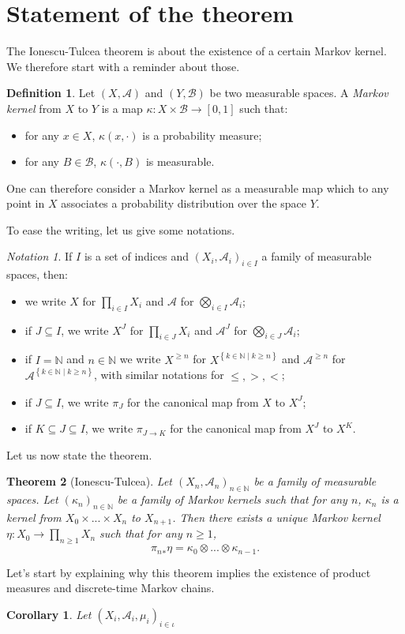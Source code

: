 \documentclass{article}
\newcommand{\A}{\mathcal{A}}
\newcommand{\B}{\mathcal{B}}
\newcommand{\N}{\mathbb{N}}
\newcommand{\set}[1]{\left\{#1\right\}}
\newcommand{\Xge}[1]{X^{\ge#1}}
\newcommand{\Age}[1]{\mathcal{A}^{\ge#1}}
\newtheorem{thm}{Theorem}[section]
\newtheorem{cor}{Corollary}[thm]
\theoremstyle{definition}
\newtheorem{defi}[thm]{Definition}
\theoremstyle{remark}
\newtheorem*{nota}{Notation}
\begin{document}
	\section{Statement of the theorem}
	The Ionescu-Tulcea theorem is about the existence of a certain Markov kernel. We therefore start with a reminder about those.

	\begin{defi}\label{def:markov-kernel}
		Let $(X,\A)$ and $(Y,\B)$ be two measurable spaces. A \emph{Markov kernel} from $X$ to $Y$ is a map $\kappa : X \times \B \to [0,1]$ such that:
		\begin{itemize}
			\item for any $x \in X$, $\kappa(x,\cdot)$ is a probability measure;
			\item for any $B \in \B$, $\kappa(\cdot,B)$ is measurable.
		\end{itemize}
		One can therefore consider a Markov kernel as a measurable map which to any point in $X$ associates a probability distribution over the space $Y$.
	\end{defi}

	To ease the writing, let us give some notations.

	\begin{nota}
		If $I$ is a set of indices and $(X_i, \A_i)_{i \in I}$ a family of measurable spaces, then:
		\begin{itemize}
			\item we write $X$ for $\prod_{i \in I} X_i$ and $\A$ for $\bigotimes_{i \in I} \A_i$;
			\item if $J \subseteq I$, we write $X^J$ for $\prod_{i \in J} X_i$ and $\A^J$ for $\bigotimes_{i \in J} \A_i$;
			\item if $I = \N$ and $n \in \N$ we write $\Xge{n}$ for $X^{\set{k \in \N \mid k \ge n}}$ and $\Age{n}$ for $\A^{\set{k \in \N \mid k \ge n}}$, with similar notations for $\le, >, <$;
			\item if $J \subseteq I$, we write $\pi_J$ for the canonical map from $X$ to $X^J$;
			\item if $ K \subseteq J \subseteq I$, we write $\pi_{J\to K}$ for the canonical map from $X^J$ to $X^K$.
		\end{itemize}
	\end{nota}

	Let us now state the theorem.

	\begin{thm}[Ionescu-Tulcea]\label{thm:it}
		Let $(X_n,\A_n)_{n\in\N}$ be a family of measurable spaces. Let $(\kappa_n)_{n\in\N}$ be a family of Markov kernels such that for any $n$, $\kappa_n$ is a kernel from $X_0 \times ... \times X_n$ to $X_{n+1}$. Then there exists a unique Markov kernel $\eta : X_0 \to \prod_{n\ge1}X_n$ such that for any $n\ge1$,
		$${\pi_n}_*\eta = \kappa_0 \otimes ... \otimes \kappa_{n-1}.$$
	\end{thm}

	Let's start by explaining why this theorem implies the existence of product measures and discrete-time Markov chains.

	\begin{cor}\label{cor:product-measure}
		Let $(X_i, \A_i, \mu_i)_{i\in\iota}$
	\end{cor}
\end{document}
